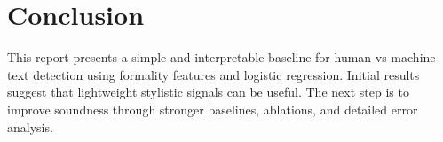 \section{Conclusion}

This report presents a simple and interpretable baseline for human-vs-machine
text detection using formality features and logistic regression. Initial results
suggest that lightweight stylistic signals can be useful. The next step is to
improve soundness through stronger baselines, ablations, and detailed error
analysis.
